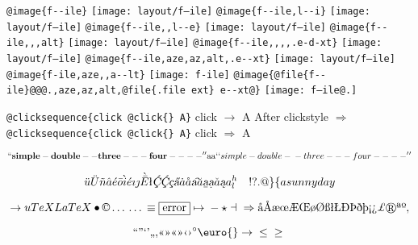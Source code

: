 \documentclass{book}
\renewcommand{\includegraphics}[1]{\fbox{FIG #1}}
\begin{document}
\texttt{@image\{f{-}{-}ile\}} \texttt{[image: layout/f--ile]}
\texttt{@image\{f{-}{-}ile,l{-}{-}i\}} \texttt{[image: layout/f--ile]}
\texttt{@image\{f{-}{-}ile,,l{-}{-}e\}} \texttt{[image: layout/f--ile]}
\texttt{@image\{f{-}{-}ile,,,alt\}} \texttt{[image: layout/f--ile]}
\texttt{@image\{f{-}{-}ile,,,,.e-d-xt\}} \texttt{[image: layout/f--ile]}
\texttt{@image\{f{-}{-}ile,aze,az,alt,.e{-}{-}xt\}} \texttt{[image: layout/f--ile]}
\texttt{@image\{f-ile,aze,,a{-}{-}lt\}} \texttt{[image: f-ile]}
\texttt{@image\{@file\{f{-}{-}ile\}@@@.,aze,az,alt,@file\{.file ext\} e{-}{-}xt@\}} \texttt{[image: f--ile@.]}

\baselineskip

\texttt{@clicksequence\{click @click\{\} A\}} click $\rightarrow{}$ A
After clickstyle $\Rightarrow{}$
\texttt{@clicksequence\{click @click\{\} A\}} click $\Rightarrow{}$ A

$$
\mathbf{``simple-double--three---four----''} \hbox{aa}
`\hbox{}`simple-double-\hbox{}-three---four----'\hbox{}'\leavevmode{}\\
$$

$$
\ddot{u} \ddot{U} \tilde{n} \hat{a} \acute{e} \bar{o} \grave{i} \acute{e} \imath{} \jmath{} \grave{\bar{E}}
\mathord{\text{\l{}}} \textsl{\c{\'{C}}} \textsl{\c{\'{C}}} \textsl{\c{c}} \textsl{\H{a}} \dot{a} \mathring{a} \textsl{\t{a}}
\breve{a} \textsl{\b{a}} \textsl{\d{a}} \check{a} \textsl{\k{a}} a^{h}_{l}
\leavevmode{}\\ \ {}\ {} \ {}\-{}   ! ? . @ \} \{ 
a sunny day
$$

$$
\rightarrow{}
u
TeX LaTeX \bullet{} \copyright{} \dots{} \dots{} \equiv{}
\fbox{error} \mapsto{} - \star{} \dashv{} \Rightarrow{}
\mathord{\text{\aa{}}} \mathord{\text{\AA{}}} \mathord{\text{\ae{}}} \mathord{\text{\oe{}}} \mathord{\text{\AE{}}} \mathord{\text{\OE{}}} \mathord{\text{\o{}}} \mathord{\text{\O{}}} \mathord{\text{\ss{}}} \mathord{\text{\l{}}} \mathord{\text{\L{}}} \mathord{\text{\DH{}}}
\mathord{\text{\TH{}}} \mathord{\text{\dh{}}} \mathord{\text{\th{}}} \mathord{\text{\textexclamdown{}}} \mathord{\text{\textquestiondown{}}} \mathsterling{}
\circledR{} \mathord{\text{\textordfeminine{}}} \mathord{\text{\textordmasculine{}}} , 
$$

$$
\mathord{\text{\textquotedblleft{}}} \mathord{\text{\textquotedblright{}}} 
\mathord{\text{\textquoteleft{}}} \mathord{\text{\textquoteright{}}} \mathord{\text{\quotedblbase{}}} \mathord{\text{\quotesinglbase{}}} \mathord{\text{\guillemotleft{}}}
\mathord{\text{\guillemotright{}}} \mathord{\text{\guillemotleft{}}} \mathord{\text{\guillemotright{}}} \mathord{\text{\guilsinglleft{}}}
\mathord{\text{\guilsinglright{}}} ^{\circ{}} \euro{} \rightarrow{} \leq{} \geq{}
$$
\end{document}
